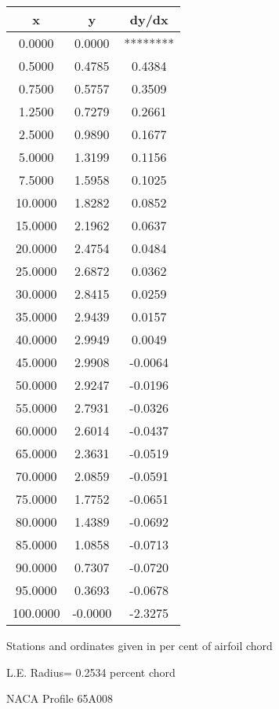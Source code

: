 \documentclass[11pt]{book}
\begin{document}
 \vspace{8mm}
 \begin{tabular}{|c|c|c|} \hline 
  x  &  y  &  dy/dx \\
 \hline
0.0000 & 0.0000 & ******** \\
0.5000 & 0.4785 & 0.4384 \\
0.7500 & 0.5757 & 0.3509 \\
1.2500 & 0.7279 & 0.2661 \\
2.5000 & 0.9890 & 0.1677 \\
5.0000 & 1.3199 & 0.1156 \\
7.5000 & 1.5958 & 0.1025 \\
10.0000 & 1.8282 & 0.0852 \\
15.0000 & 2.1962 & 0.0637 \\
20.0000 & 2.4754 & 0.0484 \\
25.0000 & 2.6872 & 0.0362 \\
30.0000 & 2.8415 & 0.0259 \\
35.0000 & 2.9439 & 0.0157 \\
40.0000 & 2.9949 & 0.0049 \\
45.0000 & 2.9908 & -0.0064 \\
50.0000 & 2.9247 & -0.0196 \\
55.0000 & 2.7931 & -0.0326 \\
60.0000 & 2.6014 & -0.0437 \\
65.0000 & 2.3631 & -0.0519 \\
70.0000 & 2.0859 & -0.0591 \\
75.0000 & 1.7752 & -0.0651 \\
80.0000 & 1.4389 & -0.0692 \\
85.0000 & 1.0858 & -0.0713 \\
90.0000 & 0.7307 & -0.0720 \\
95.0000 & 0.3693 & -0.0678 \\
100.0000 & -0.0000 & -2.3275 \\
 \hline
 \end{tabular}
 \vspace{8mm}


Stations and ordinates given in per cent of airfoil chord 


L.E. Radius=  0.2534 percent chord
 \newpage
  \label{p65A008}
 \begin{Large}
 NACA Profile 65A008
 \end{Large}
  
\end{document}

